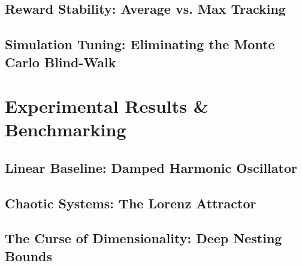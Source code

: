 \documentclass[11pt, a4paper]{article}
\begin{document}
\subsection{Reward Stability: Average vs. Max Tracking}

\subsection{Simulation Tuning: Eliminating the Monte Carlo Blind-Walk}

\section{Experimental Results \& Benchmarking}

\subsection{Linear Baseline: Damped Harmonic Oscillator}

\subsection{Chaotic Systems: The Lorenz Attractor}

\subsection{The Curse of Dimensionality: Deep Nesting Bounds}
\end{document}
